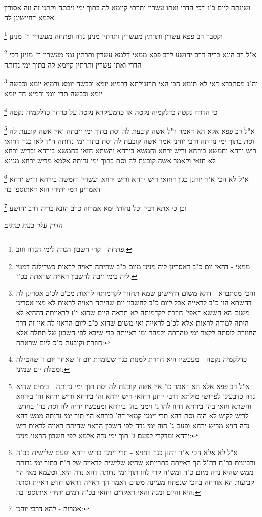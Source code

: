 \documentclass[12pt, openany]{book}
\newcommand{\footnotecomment}[1]{
	\renewcommand\thefootnote{}
	\footnote{#1}}
\newcommand{\commenta}[1]{\footnotecomment{#1}}
\begin{document}
{ושינתה ליום כ"ז דכי הדרי ואתו עשרין ותרתי קיימא לה בתוך ימי זיבתה וקתני זה וזה אסורין אלמא דחיישינן לה 
\commenta{פתחה - קרי חשבון הנדה לימי הנדה וזוב:}
וקסבר רב פפא עשרין ותרתין מעשרין ותרתין מנינן נדה ופתחה מעשרין וז' מנינן 
\commenta{ממאי - דהאי יום כ"ב דאסרינן ליה מנינן מיום כ"ב שהיתה ראויה לראות כשדילגה דמטי ליה בימי זיבה לחשבון ראייה שראתה בכ"ז:}
א"ל רב הונא בריה דרב יהושע לרב פפא ממאי דלמא עשרין ותרתין נמי מעשרין וז' מנינן דכי הדרי ואתו עשרין ותרתין קיימא לה בתוך ימי נדותה 
\commenta{והכי מסתברא - דהא משום דחיישינן שמא תחזור לקדמותה לראות מכ"ב לכ"ב אסרינן לה דהשתא הוי כ"ב לראייה אבל ליום כ"ב לחשבון יום שהיתה ראויה לראות לא מצי אסרינן משום הא חששא דאפי' חוזרת לקדמותה לא תראה היום שהוא י"ז לראייתה דההיא לא היתה למודה לראות אלא לכ"ב לראייה ואי משום שהוא כ"ב ליום הראוי לה אין זה דרך החוזרת לוסתה לקצר ימי טהרתה ולמהר ימי ראייתה כדי שיבא לפי חשבון של תחלה אלא חוזרת וקובעת כ"כ ליום שראתה: }
וה"נ מסתברא דאי לא תימא הכי האי תרנגולתא דרמיא יומא וכבשה יומא ורמיא יומא וכבשה יומא וכבשה תרי יומי ורמיא חד יומא
\commenta{כדלקמיה נקטה - מעכשיו היא חוזרת למנות כגון שעומדת יום ז' שאחר יום ו' שהטילה ומטלת יום שמיני:}
כי הדרה נקטה כדלקמיה נקטה או כדמעיקרא נקטה על כרחך כדלקמיה נקטה 
\commenta{א"ל רב פפא אלא הא דאמר כו' אין אשה קובעת לה וסת תוך ימי נדותה - בימים שהיא נדה כדבעינן לפרושי מילתא דרבי יוחנן דחזאי ריש ירחא וה' בירחא וריש ירחא וה' בירחא והשתא חזאי בה' בירחא דהוו להו ג' זימני בה' בירחא ומעכשיו יהיה לה וסת בה' בחדש. לריש לקיש לא הוה וסת דהא תרי זימני קמאי דה' בירחא הוי תוך ימי נדותה ממש דהא נדה הויא מריש ירחא ופעם ג' הוה ימי נדה לפי חשבון הראוי שהיתה ראויה לראות ריש ירחא ומדקרי לפעם ג' תוך ימי נדה אלמא לפי חשבון הראוי מנינן:}
א"ל רב פפא אלא הא דאמר ר"ל אשה קובעת לה וסת בתוך ימי זיבתה ואין אשה קובעת לה וסת בתוך ימי נדותה ורבי יוחנן אמר אשה קובעת לה וסת בתוך ימי נדותה ה"ד 
לאו כגון דחזאי ריש ירחא וחמשא בירחא וריש ירחא וחמשא בירחא והשתא חזאי בחמשא בירחא ובריש ירחא לא חזאי
וקאמר אשה קובעת לה וסת בתוך ימי נדותה אלמא מריש ירחא מנינא 
\commenta{א"ל לא אלא הכי א"ר יוחנן כגון דחזיא - תרי זימני בריש ירחא ופעם שלישית בכ"ה ורביעית בר"ח דה"ל הך ראייתה בתרייתא שהיא שלישית לראייה של ר"ח בתוך ימי נדותה ממש שהיא נדה מיום כ"ה ומש"ה קרי להו תוך ימי נדותה דהא נדה היא. וטעמא מאי הוי קביעות הא אורחה בהכי שנפתח מעיינה משום דאמר הך ראייה דראש חדש ראיית וסתה היא והיום זמנה והאי דאקדים וחזאי בכ"ה דמים יתירי איתוספו בה:}
א"ל לא הכי א"ר יוחנן כגון דחזאי ריש ירחא וריש ירחא ועשרין וחמשה בירחא וריש ירחא דאמרינן דמי יתירי הוא דאתוספו בה 
\commenta{אמרוה - להא דרבי יוחנן:}
וכן כי אתא רבין וכל נחותי ימא אמרוה כרב הונא בריה דרב יהושע
\par \par {\large\emph{הדרן עלך בנות כותים}}\par \par }
\end{document}
